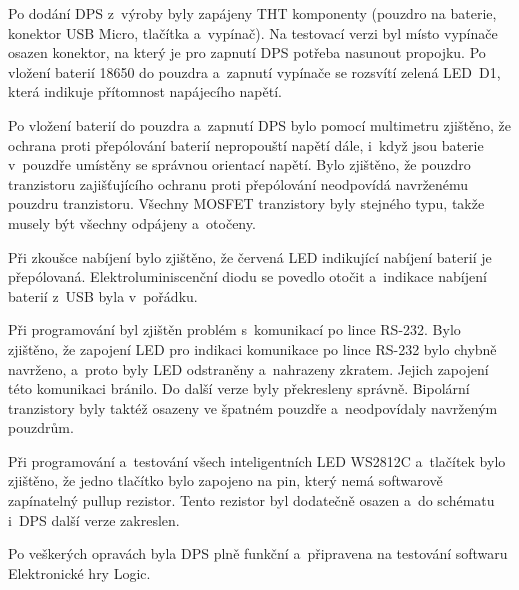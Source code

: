   Po dodání DPS z~výroby byly zapájeny THT komponenty (pouzdro na baterie, konektor USB Micro, tlačítka a~vypínač). Na testovací verzi
  byl místo vypínače osazen konektor, na který je pro zapnutí DPS potřeba nasunout propojku. Po vložení baterií
  18650 do pouzdra a~zapnutí vypínače se rozsvítí zelená LED~D1, která indikuje přítomnost napájecího napětí. 

  Po vložení baterií do pouzdra a~zapnutí DPS bylo pomocí multimetru zjištěno, že ochrana proti přepólování baterií nepropouští napětí 
  dále, i~když jsou baterie v~pouzdře umístěny se správnou orientací napětí. Bylo zjištěno, že pouzdro tranzistoru zajišťujícího ochranu proti přepólování 
  neodpovídá navrženému pouzdru tranzistoru. Všechny MOSFET tranzistory byly stejného typu, takže musely být všechny odpájeny a~otočeny.
  
  Při zkoušce nabíjení bylo zjištěno, že červená LED indikující nabíjení baterií je přepólovaná. Elektroluminiscenční diodu se povedlo otočit a~indikace nabíjení 
  baterií z~USB byla v~pořádku. 
  
  Při programování byl zjištěn problém s~komunikací po lince RS-232. Bylo zjištěno, že zapojení LED pro indikaci komunikace po lince RS-232 bylo 
  chybně navrženo, a~proto byly LED odstraněny a~nahrazeny zkratem. Jejich zapojení této komunikaci bránilo. Do další verze byly překresleny správně.
  Bipolární tranzistory byly taktéž osazeny ve špatném pouzdře a~neodpovídaly navrženým pouzdrům. 
  
  Při programování a~testování všech inteligentních LED WS2812C a~tlačítek bylo zjištěno, že jedno tlačítko bylo zapojeno na pin, který 
  nemá softwarově zapínatelný pullup rezistor. Tento rezistor byl dodatečně osazen a~do schématu i~DPS další verze zakreslen. 
  
  Po veškerých opravách byla DPS plně funkční a~připravena na testování softwaru Elektronické hry Logic.

